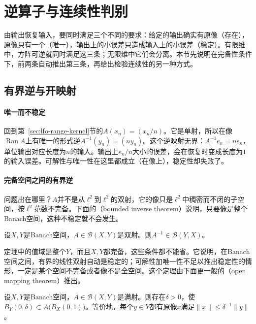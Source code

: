 
\section{逆算子与连续性判别}
\label{sec:lfo-inverse}

由输出恢复输入，要同时满足三个不同的要求：给定的输出确实有原像（存在），原像只有一个（唯一），输出上的小误差只造成输入上的小误差（稳定）。有限维中，方阵可逆就同时满足这三条；无限维中它们会分离。本节先说明在完备性条件下，前两条自动推出第三条，再给出检验连续性的另一种方式。

\subsection{有界逆与开映射}
\label{sec:lfo-open-mapping}

\paragraph{唯一而不稳定}
回到第~\ref{sec:lfo-range-kernel}节的$A(x_n)=(x_n/n)$。它是单射，所以在像$\operatorname{Ran}A$上有唯一的形式逆$A^{-1}(y_n)=(ny_n)$。这个逆映射无界：$A^{-1}e_n=ne_n$，单位输出对应长度为$n$的输入。输出上$e_n/n$大小的误差，会在恢复时变成长度为$1$的输入误差。可解性与唯一性在这里都成立（在像上），稳定性却失败了。

\paragraph{完备空间之间的有界逆}
问题出在哪里？$A$并不是从$\ell^2$到$\ell^2$的双射，它的像只是$\ell^2$中稠密而不闭的子空间，按$\ell^2$范数不完备。下面的（bounded inverse theorem）说明，只要像是整个Banach空间，这种不稳定就不会发生。

\begin{theorem}[有界逆定理]
\label{thm:lfo-bounded-inverse}
设$X,Y$是Banach空间，$A\in\mathcal B(X,Y)$是双射。则$A^{-1}\in\mathcal B(Y,X)$。
\end{theorem}

定理中的值域是整个$Y$，而且$X,Y$都完备，这些条件都不能省。它说明，在Banach空间之间，有界的线性双射自动是稳定的；可解性加唯一性不足以推出稳定性的情形，一定是某个空间不完备或者像不是全空间。这个定理由下面更一般的（open mapping theorem）推出。

\begin{theorem}[开映射定理]
\label{thm:lfo-open-mapping}
设$X,Y$是Banach空间，$A\in\mathcal B(X,Y)$是满射。则存在$\delta>0$，使$B_Y(0,\delta)\subset A\bigl(B_X(0,1)\bigr)$。等价地，每个$y\in Y$都有原像$x$满足$\|x\|\leq\delta^{-1}\|y\|$。
\end{theorem}

